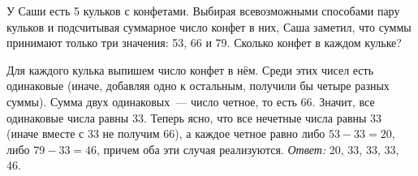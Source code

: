 \problem{}
У Саши есть 5 кульков с конфетами.
Выбирая всевозможными способами пару кульков и подсчитывая суммарное число
конфет в них, Саша заметил, что суммы принимают только три значения:
53, 66 и 79.
Сколько конфет в каждом кульке?

\solution
Для каждого кулька выпишем число конфет в нём.
Среди этих чисел есть одинаковые
(иначе, добавляя одно к остальным, получили бы четыре разных суммы).
Сумма двух одинаковых~--- число четное, то есть 66.
Значит, все одинаковые числа равны 33.
Теперь ясно, что все нечетные числа равны 33
(иначе вместе с 33 не получим 66), а каждое четное равно
либо $53 - 33 = 20$, либо $79 - 33 = 46$, причем оба эти случая реализуются.
\emph{Ответ:} 20, 33, 33, 33, 46.

\endproblem
